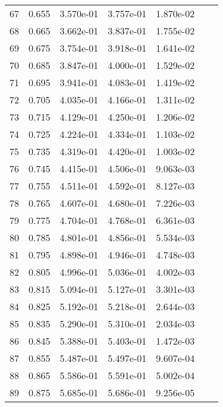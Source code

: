 \begin{table}[ht]
\begin{tabular}{rcccccc}
    67 &  0.655 &       3.570e-01 &       3.757e-01  &        1.870e-02\\ 
    68 &  0.665 &       3.662e-01 &       3.837e-01  &        1.755e-02\\ 
    69 &  0.675 &       3.754e-01 &       3.918e-01  &        1.641e-02\\ 
    70 &  0.685 &       3.847e-01 &       4.000e-01  &        1.529e-02\\ 
    71 &  0.695 &       3.941e-01 &       4.083e-01  &        1.419e-02\\ 
    72 &  0.705 &       4.035e-01 &       4.166e-01  &        1.311e-02\\ 
    73 &  0.715 &       4.129e-01 &       4.250e-01  &        1.206e-02\\ 
    74 &  0.725 &       4.224e-01 &       4.334e-01  &        1.103e-02\\ 
    75 &  0.735 &       4.319e-01 &       4.420e-01  &        1.003e-02\\ 
    76 &  0.745 &       4.415e-01 &       4.506e-01  &        9.063e-03\\ 
    77 &  0.755 &       4.511e-01 &       4.592e-01  &        8.127e-03\\ 
    78 &  0.765 &       4.607e-01 &       4.680e-01  &        7.226e-03\\ 
    79 &  0.775 &       4.704e-01 &       4.768e-01  &        6.361e-03\\ 
    80 &  0.785 &       4.801e-01 &       4.856e-01  &        5.534e-03\\ 
    81 &  0.795 &       4.898e-01 &       4.946e-01  &        4.748e-03\\ 
    82 &  0.805 &       4.996e-01 &       5.036e-01  &        4.002e-03\\ 
    83 &  0.815 &       5.094e-01 &       5.127e-01  &        3.301e-03\\ 
    84 &  0.825 &       5.192e-01 &       5.218e-01  &        2.644e-03\\ 
    85 &  0.835 &       5.290e-01 &       5.310e-01  &        2.034e-03\\ 
    86 &  0.845 &       5.388e-01 &       5.403e-01  &        1.472e-03\\ 
    87 &  0.855 &       5.487e-01 &       5.497e-01  &        9.607e-04\\ 
    88 &  0.865 &       5.586e-01 &       5.591e-01  &        5.002e-04\\ 
    89 &  0.875 &       5.685e-01 &       5.686e-01  &        9.256e-05\\ 

\end{tabular}
\end{table}
